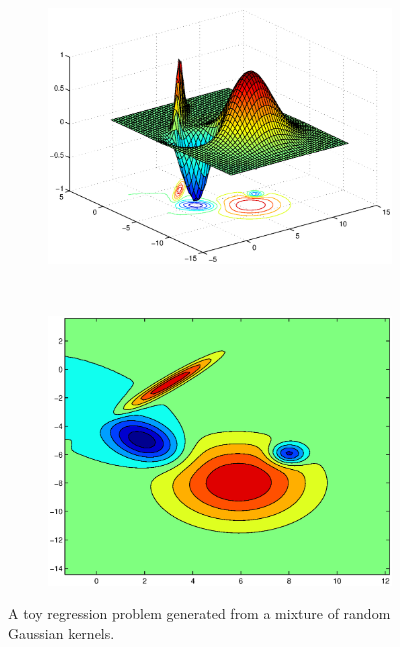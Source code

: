 \documentclass[useAMS,usenatbib,fleqn]{mn2e}
\begin{document}
\begin{figure}
        \centering
        \begin{subfigure}[b]{0.45\columnwidth}
                \includegraphics[width=\textwidth]{figures/surface.eps}
        \end{subfigure}
        ~
         \begin{subfigure}[b]{0.45\columnwidth}
                \includegraphics[width=\textwidth]{figures/contour.eps}
        \end{subfigure}
                       
        \caption{A toy regression problem generated from a mixture of random Gaussian kernels. }       
       \label{fig-toy-example}
\end{figure}
\end{document}
